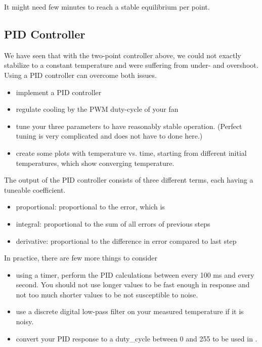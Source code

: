 It might need few minutes to reach a stable equilibrium per point.


\subsection{PID Controller}
We have seen that with the two-point controller above, we could not exactly stabilize to a constant temperature and were suffering from under- and overshoot. Using a \ac{PID} controller can overcome both issues.
\begin{itemize}
	\item implement a \ac{PID} controller
	\item regulate cooling by the PWM duty-cycle of your fan
	\item tune your three parameters to have reasonably stable operation. (Perfect tuning is very complicated and does not have to done here.)
	\item create some plots with temperature vs. time, starting from different initial temperatures, which show converging temperature.
\end{itemize}

The output of the PID controller consists of three different terms, each having a tuneable coefficient.
\begin{itemize}
	\item proportional: proportional to the error, which is 
	\item integral: proportional to the sum of all errors of previous steps
	\item derivative: proportional to the difference in error compared to last step
\end{itemize}

In practice, there are few more things to consider
\begin{itemize}
    \item using a timer, perform the PID calculations between every 100 ms and every second. You should not use longer values to be fast enough in response and not too much shorter values to be not susceptible to noise.
    \item use a discrete digital low-pass filter on your measured temperature if it is noisy.
    \item convert your PID response to a duty\_cycle between 0 and 255 to be used in . 
\end{itemize}

\begin{center}
\end{center}

